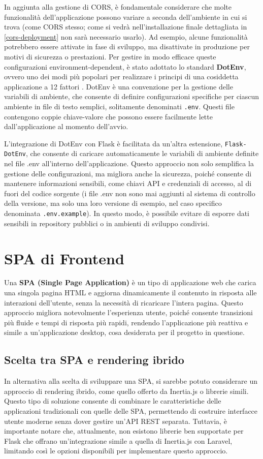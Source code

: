 In aggiunta alla gestione di CORS, è fondamentale considerare che molte funzionalità dell'applicazione possono variare a seconda dell'ambiente in cui si trova (come CORS stesso; come si vedrà nell'installazione finale dettagliata in \ref{cors-deployment} non sarà necessario usarlo). Ad esempio, alcune funzionalità potrebbero essere attivate in fase di sviluppo, ma disattivate in produzione per motivi di sicurezza o prestazioni. Per gestire in modo efficace queste configurazioni environment-dependent, è stato adottato lo standard \textbf{DotEnv}, ovvero uno dei modi più popolari per realizzare i principi di una cosiddetta applicazione a 12 fattori \cite{12-factor}. DotEnv è una convenzione per la gestione delle variabili di ambiente, che consente di definire configurazioni specifiche per ciascun ambiente in file di testo semplici, solitamente denominati \texttt{.env}. Questi file contengono coppie chiave-valore che possono essere facilmente lette dall'applicazione al momento dell'avvio.

L'integrazione di DotEnv con Flask è facilitata da un'altra estensione, \texttt{Flask-DotEnv}, che consente di caricare automaticamente le variabili di ambiente definite nel file .env all'interno dell'applicazione. Questo approccio non solo semplifica la gestione delle configurazioni, ma migliora anche la sicurezza, poiché consente di mantenere informazioni sensibili, come chiavi API e credenziali di accesso, al di fuori del codice sorgente (i file .env non sono mai aggiunti al sistema di controllo della versione, ma solo una loro versione di esempio, nel caso specifico denominata \texttt{.env.example}). In questo modo, è possibile evitare di esporre dati sensibili in repository pubblici o in ambienti di sviluppo condivisi.

\section{SPA di Frontend}
Una \textbf{SPA (Single Page Application)} è un tipo di applicazione web che carica una singola pagina HTML e aggiorna dinamicamente il contenuto in risposta alle interazioni dell'utente, senza la necessità di ricaricare l'intera pagina. Questo approccio migliora notevolmente l'esperienza utente, poiché consente transizioni più fluide e tempi di risposta più rapidi, rendendo l'applicazione più reattiva e simile a un'applicazione desktop, cosa desiderata per il progetto in questione.

\subsection{Scelta tra SPA e rendering ibrido}
In alternativa alla scelta di sviluppare una SPA, si sarebbe potuto considerare un approccio di rendering ibrido, come quello offerto da Inertia.js o librerie simili. Questo tipo di soluzione consente di combinare le caratteristiche delle applicazioni tradizionali con quelle delle SPA, permettendo di costruire interfacce utente moderne senza dover gestire un'API REST separata. Tuttavia, è importante notare che, attualmente, non esistono librerie ben supportate per Flask che offrano un'integrazione simile a quella di Inertia.js con Laravel, limitando così le opzioni disponibili per implementare questo approccio.

